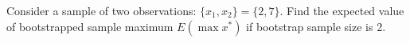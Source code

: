 
\begin{question}
Consider a sample of two observations: \(\{x_1,x_2\} = \{2, 7\}\). Find the expected value of bootstrapped sample maximum \(E(\max{x^*})\) if bootstrap sample size is 2.
\end{question}


